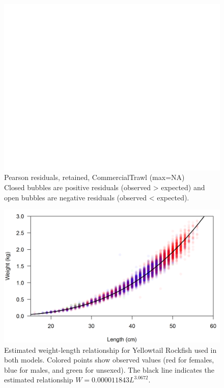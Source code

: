 \documentclass[12pt,]{article}
\begin{document}
\begin{figure}[htbp]
\centering
\includegraphics{./r4ss/plots_mod1/comp_gstlenfit_residsflt1mkt2.png}
\caption{Pearson residuals, retained, CommercialTrawl (max=NA)\\
Closed bubbles are positive residuals (observed \textgreater{} expected)
and open bubbles are negative residuals (observed \textless{} expected).
\label{fig:mod1_40_comp_gstlenfit_residsflt1mkt2}}
\end{figure}

\FloatBarrier

\begin{figure}[htbp]
\centering
\includegraphics{Figures/weight-length_fit.png}
\caption{Estimated weight-length relationship for Yellowtail Rockfish
used in both models. Colored points show observed values (red for
females, blue for males, and green for unsexed). The black line
indicates the estimated relationship
\(W = 0.000011843L^{3.0672}\).\label{fig:weight-length}}
\end{figure}
\end{document}
